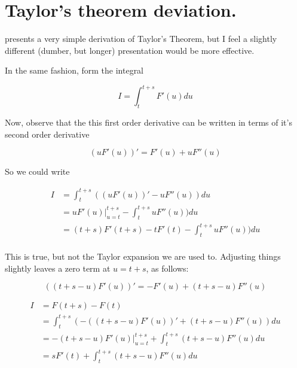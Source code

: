 
%


\chapter{Taylor's theorem deviation.}
\date{ Feb. 2, 2008. Last Revision: $Date: 2009/06/04 12:52:02 $ } %

%


\cite{hestenes1999nfc} presents a very simple derivation of Taylor's Theorem,
but I feel a
slightly different (dumber, but longer) presentation would be more effective.

In the same fashion, form the integral

\[
I = \int_{t}^{t+s} F'(u) du
\]

Now, observe that the this first order derivative can be written in
terms of it's second order derivative

\[
(u F'(u))' = F'(u) + u F''(u)
\]

So we could write

\begin{align*}
I &= \int_{t}^{t+s} ((u F'(u))' - u F''(u)) du \\
  &= {u F'(u)} \vert_{u=t}^{t+s} - \int_{t}^{t+s} u F''(u)) du \\
  &= (t+s) F'(t+s) - t F'(t) - \int_{t}^{t+s} u F''(u)) du \\
\end{align*}

This is true, but not the Taylor expansion we are used to.  Adjusting things slightly leaves a zero term at $u=t+s$, as follows:

\[
\left((t + s - u) F'(u)\right)' = -F'(u) + (t+s-u) F''(u)
\]

\begin{align*}
I &= F(t+s) - F(t) \\
 &= \int_{t}^{t+s} ( - ((t + s - u) F'(u))' + (t+s-u) F''(u) ) du \\
 &= - {(t + s - u) F'(u)} \vert_{u=t}^{t+s} + \int_{t}^{t+s} (t+s-u) F''(u) du \\
 &= s F'(t) + \int_{t}^{t+s} (t+s-u) F''(u) du \\
\end{align*}

